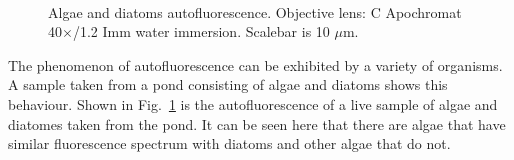 \begin{figure}[h!]
\centering
{}\hspace{0.1em}
\hspace{0.1em}
\\
\caption{Algae and diatoms autofluorescence. 
Objective lens: C Apochromat 40$\times$/1.2 Imm water immersion. 
Scalebar is 10 $\mu$m.}
\label{fig:diatalg}
\end{figure}

The phenomenon of autofluorescence can be exhibited by a variety of organisms. 
A sample taken from a pond consisting of algae and diatoms shows this behaviour. 
Shown in Fig.~\ref{fig:diatalg} is the autofluorescence of a live sample of algae and diatomes taken from the pond. 
It can be seen here that there are algae that have similar fluorescence spectrum with diatoms and other algae that do not.

